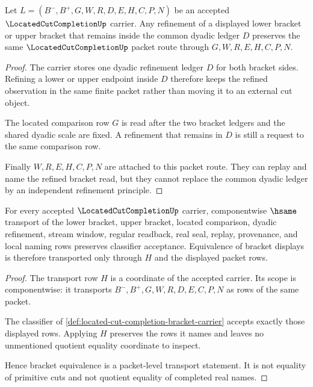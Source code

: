 \begin{theorem}\label{thm:located-cut-completion-common-refinement-stability}
Let $L=(B^{-},B^{+},G,W,R,D,E,H,C,P,N)$ be an accepted $\LocatedCutCompletionUp$ carrier. Any refinement of a displayed lower bracket or upper bracket that remains inside the common dyadic ledger $D$ preserves the same $\LocatedCutCompletionUp$ packet route through $G,W,R,E,H,C,P,N$.
\end{theorem}
\begin{proof}
The carrier stores one dyadic refinement ledger $D$ for both bracket sides. Refining a lower or upper endpoint inside $D$ therefore keeps the refined observation in the same finite packet rather than moving it to an external cut object.

The located comparison row $G$ is read after the two bracket ledgers and the shared dyadic scale are fixed. A refinement that remains in $D$ is still a request to the same comparison row.

Finally $W,R,E,H,C,P,N$ are attached to this packet route. They can replay and name the refined bracket read, but they cannot replace the common dyadic ledger by an independent refinement principle.
\end{proof}

\begin{theorem}\label{thm:located-cut-completion-classifier-transport}
For every accepted $\LocatedCutCompletionUp$ carrier, componentwise $\hsame$ transport of the lower bracket, upper bracket, located comparison, dyadic refinement, stream window, regular readback, real seal, replay, provenance, and local naming rows preserves classifier acceptance. Equivalence of bracket displays is therefore transported only through $H$ and the displayed packet rows.
\end{theorem}
\begin{proof}
The transport row $H$ is a coordinate of the accepted carrier. Its scope is componentwise: it transports $B^{-},B^{+},G,W,R,D,E,C,P,N$ as rows of the same packet.

The classifier of \autoref{def:located-cut-completion-bracket-carrier} accepts exactly those displayed rows. Applying $H$ preserves the rows it names and leaves no unmentioned quotient equality coordinate to inspect.

Hence bracket equivalence is a packet-level transport statement. It is not equality of primitive cuts and not quotient equality of completed real names.
\end{proof}

